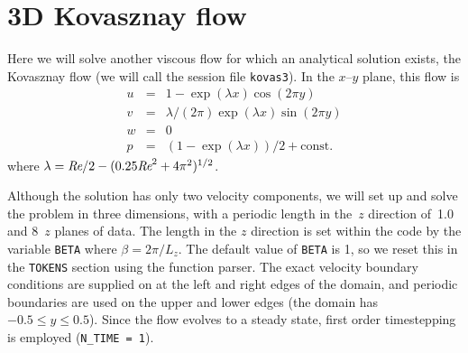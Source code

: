 \documentclass[11pt]{report}
\def\Rey{\mbox{\it Re}}                             %
\begin{document}
\section{3D Kovasznay flow}
\label{sec.kovas}

Here we will solve another viscous flow for which an analytical
solution exists, the Kovasznay flow (we will call the session file
\verb+kovas3+).  In the $x$--$y$ plane, this flow is
\begin{eqnarray}
        u &=& 1 - \exp(\lambda x)\cos(2\pi y)           \\
        v &=& \lambda/(2\pi)\exp(\lambda x)\sin(2\pi y) \\
        w &=& 0                                         \\
        p &=& (1 - \exp(\lambda x))/2  + \textrm{const}. 
\end{eqnarray}
where $\lambda = \Rey/2 - (0.25\Rey^2 + 4\pi^2)^{1/2}$.

Although the solution has only two velocity components, we will set up
and solve the problem in three dimensions, with a periodic length in
the~$z$ direction of~1.0 and 8~$z$ planes of data.  The length in the
$z$ direction is set within the code by the variable \verb+BETA+ where
$\beta=2\pi/L_z$.  The default value of \verb+BETA+ is 1, so we reset
this in the \texttt{TOKENS} section using the function parser.  The
exact velocity boundary conditions are supplied on at the left and
right edges of the domain, and periodic boundaries are used on the
upper and lower edges (the domain has $-0.5\le y\le0.5$).  Since the
flow evolves to a steady state, first order timestepping is employed
(\verb+N_TIME = 1+).
\end{document}
